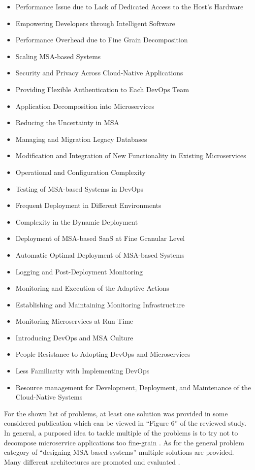 \begin{itemize}
    \item Performance Issue due to Lack of Dedicated Access
    to the Host's Hardware
    \item Empowering Developers through Intelligent Software
    \item Performance Overhead due to Fine Grain Decomposition
    \item Scaling MSA-based Systems
    \item Security and Privacy Across Cloud-Native Applications
    \item Providing Flexible Authentication to Each DevOps Team
    \item Application Decomposition into Microservices
    \item Reducing the Uncertainty in MSA
    \item Managing and Migration Legacy Databases
    \item Modification and Integration of New Functionality in Existing
    Microservices
    \item Operational and Configuration Complexity
    \item Testing of MSA-based Systems in DevOps
    \item Frequent Deployment in Different Environments
    \item Complexity in the Dynamic Deployment
    \item Deployment of MSA-based SaaS at Fine Granular Level
    \item Automatic Optimal Deployment of MSA-based Systems
    \item Logging and Post-Deployment Monitoring
    \item Monitoring and Execution of the Adaptive Actions
    \item Establishing and Maintaining Monitoring Infrastructure
    \item Monitoring Microservices at Run Time
    \item Introducing DevOps and MSA Culture
    \item People Resistance to Adopting DevOps and Microservices
    \item Less Familiarity with Implementing DevOps
    \item Resource management for Development, Deployment,
    and Maintenance of the Cloud-Native Systems
\end{itemize}

For the shown list of problems, at least one solution was provided
in some considered publication which can be viewed in ``Figure 6''
of the reviewed study. In general, a purposed idea to tackle multiple
of the problems is to try not to decompose microservice applications
too fine-grain \cite{waseem:SMSMSADevOps}. As for the general problem
category of ``designing MSA based systems'' multiple solutions are provided.
Many different architectures are promoted and evaluated \cite{waseem:SMSMSADevOps}.

